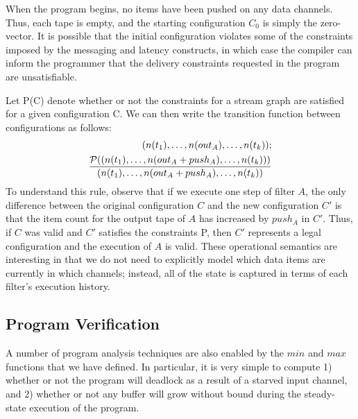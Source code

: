 When the program begins, no items have been pushed on any data
channels.  Thus, each tape is empty, and the starting configuration
$C_0$ is simply the zero-vector.  It is possible that the initial
configuration violates some of the constraints imposed by the
messaging and latency constructs, in which case the compiler can
inform the programmer that the delivery constraints requested in the
program are unsatisfiable.

Let {\cal P}(C) denote whether or not the constraints for a stream
graph are satisfied for a given configuration C.  We can then write
the transition function between configurations as follows:
\begin{eqnarray*}
(n(t_1), \dots , n(out_A), \dots, n(t_k)); \\ \frac{{\cal P}((n(t_1), \dots , n(out_A + push_A), \dots, n(t_k)))}{(n(t_1), \dots , n(out_A + push_A), \dots, n(t_k))}
\end{eqnarray*}
To understand this rule, observe that if we execute one step of filter
$A$, the only difference between the original configuration $C$ and
the new configuration $C'$ is that the item count for the output tape
of $A$ has increased by $push_A$ in $C'$.  Thus, if $C$ was valid and
$C'$ satisfies the constraints {\cal P}, then $C'$ represents a legal
configuration and the execution of $A$ is valid.  These operational
semantics are interesting in that we do not need to explicitly model
which data items are currently in which channels; instead, all of the
state is captured in terms of each filter's execution history.

\subsection{Program Verification}

A number of program analysis techniques are also enabled by the $min$
and $max$ functions that we have defined.  In particular, it is very
simple to compute 1) whether or not the program will deadlock as a
result of a starved input channel, and 2) whether or not any buffer
will grow without bound during the steady-state execution of the
program.

